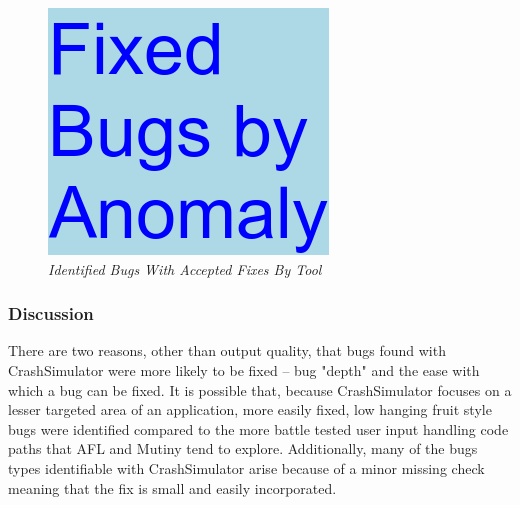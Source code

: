\begin{figure}[t]
  \center{}
  \includegraphics[scale=.5]{images/table3}
  \caption{\emph{Identified Bugs With Accepted Fixes By Tool}}
  \label{fig-fixed-tool}
\end{figure}


\subsubsection{Discussion}

There are two reasons, other than output quality, that bugs found with
CrashSimulator were more likely to be fixed -- bug "depth" and the ease
with which a bug can be fixed.  It is possible that, because CrashSimulator
focuses on a lesser targeted area of an application, more easily fixed, low
hanging fruit style bugs were identified compared to the more battle tested
user input handling code paths that AFL and Mutiny tend to explore.
Additionally, many of the bugs types identifiable with CrashSimulator arise
because of a minor missing check meaning that the fix is small and easily
incorporated.
